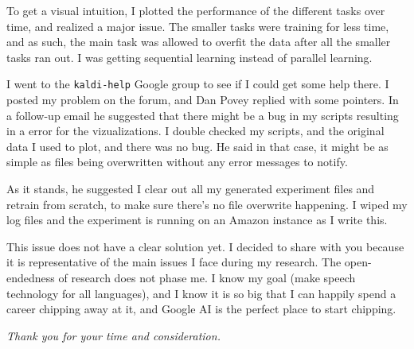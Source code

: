 \documentclass[12pt,a4paper]{article}
\begin{document}
To get a visual intuition, I plotted the performance of the different tasks over time, and realized a major issue. The smaller tasks were training for less time, and as such, the main task was allowed to overfit the data after all the smaller tasks ran out. I was getting sequential learning instead of parallel learning.

I went to the \texttt{kaldi-help} Google group to see if I could get some help there. I posted my problem on the forum, and Dan Povey replied with some pointers. In a follow-up email he suggested that there might be a bug in my scripts resulting in a error for the vizualizations. I double checked my scripts, and the original data I used to plot, and there was no bug. He said in that case, it might be as simple as files being overwritten without any error messages to notify.

As it stands, he suggested I clear out all my generated experiment files and retrain from scratch, to make sure there's no file overwrite happening. I wiped my log files and the experiment is running on an Amazon instance as I write this.

This issue does not have a clear solution yet. I decided to share with you because it is representative of the main issues I face during my research. The open-endedness of research does not phase me. I know my goal (make speech technology for all languages), and I know it is so big that I can happily spend a career chipping away at it, and Google AI is the perfect place to start chipping. 



\begin{center}
\textit{Thank you for your time and consideration.}  
\end{center}
\end{document}
